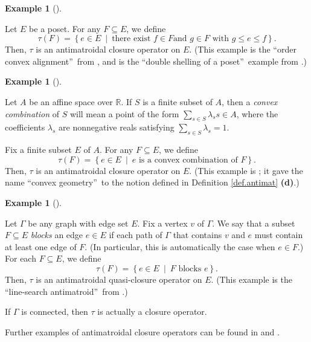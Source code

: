 \documentclass[numbers=enddot,12pt,final,onecolumn]{scrartcl}%
\theoremstyle{definition}
\newtheorem{exam}[theo]{Example}
\newenvironment{example}[1][]
{\begin{exam}[#1]\begin{leftbar}}
{\end{leftbar}\end{exam}}
\let\sumnonlimits\sum
\renewcommand{\sum}{\sumnonlimits\limits}
\renewcommand{\leq}{\leqslant}
\begin{document}
\begin{example}
\label{exa.antimat.interval}Let $E$ be a poset. For any $F\subseteq E$, we
define%
\[
\tau\left(  F\right)  =\left\{  e\in E\ \mid\ \text{there exist }f\in F\text{
and }g\in F\text{ with }g\leq e\leq f\right\}  .
\]
Then, $\tau$ is an antimatroidal closure operator on $E$. (This example is the
\textquotedblleft order convex alignment\textquotedblright\ from \cite[\S 3,
Example II]{EdeJam85}, and is the \textquotedblleft double shelling of a
poset\textquotedblright\ example from \cite[\S III.2.4]{KoLoSc91}.)
\end{example}

\begin{example}
\label{exa.antimat.convex}Let $A$ be an affine space over $\mathbb{R}$. If $S$
is a finite subset of $A$, then a \emph{convex combination} of $S$ will mean a
point of the form $\sum_{s\in S}\lambda_{s}s\in A$, where the coefficients
$\lambda_{s}$ are nonnegative reals satisfying $\sum_{s\in S}\lambda_{s}=1$.

Fix a finite subset $E$ of $A$. For any $F\subseteq E$, we define%
\[
\tau\left(  F\right)  =\left\{  e\in E\ \mid\ e\text{ is a convex combination
of }F\right\}  .
\]
Then, $\tau$ is an antimatroidal closure operator on $E$. (This example is
\cite[\S 3, Example I]{EdeJam85}; it gave the name \textquotedblleft convex
geometry\textquotedblright\ to the notion defined in Definition
\ref{def.antimat} \textbf{(d)}.)
\end{example}

\begin{example}
\label{exa.antimat.linesearch}Let $\Gamma$ be any graph with edge set $E$. Fix
a vertex $v$ of $\Gamma$. We say that a subset $F\subseteq E$ \emph{blocks} an
edge $e\in E$ if each path of $\Gamma$ that contains $v$ and $e$ must contain
at least one edge of $F$. (In particular, this is automatically the case when
$e\in F$.) For each $F\subseteq E$, we define%
\[
\tau\left(  F\right)  =\left\{  e\in E\ \mid\ F\text{ blocks }e\right\}  .
\]
Then, $\tau$ is an antimatroidal quasi-closure operator on $E$. (This example
is the \textquotedblleft line-search antimatroid\textquotedblright\ from
\cite[\S III.2.11]{KoLoSc91}.)

If $\Gamma$ is connected, then $\tau$ is actually a closure operator.
\end{example}

Further examples of antimatroidal closure operators can be found in
\cite[\S III.2]{KoLoSc91} and \cite[\S 3]{EdeJam85}.
\end{document}
